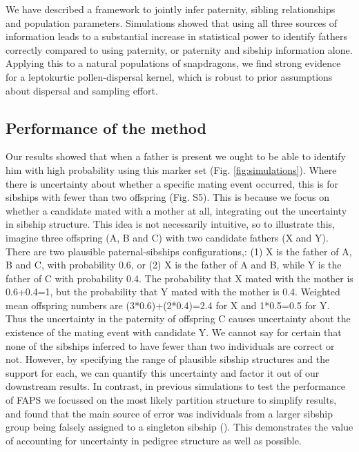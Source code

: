 \documentclass[10pt, a4paper, twocolumn]{article} %
\begin{document}
We have described a framework to jointly infer paternity, sibling relationships and population parameters. Simulations showed that using all three sources of information leads to a substantial increase in statistical power to identify fathers correctly compared to using paternity, or paternity and sibship information alone. Applying this to a natural populations of snapdragons, we find strong evidence for a leptokurtic pollen-dispersal kernel, which is robust to prior assumptions about dispersal and sampling effort.

\subsection{Performance of the method}

Our results showed that when a father is present we ought to be able to identify him with high probability using this marker set (Fig. \ref{fig:simulations}).
Where there is uncertainty about whether a specific mating event occurred, this is for sibships with fewer than two offspring (Fig. S5).
This is because we focus on whether a candidate mated with a mother at all, integrating out the uncertainty in sibship structure.
This idea is not necessarily intuitive, so to illustrate this, imagine three offspring (A, B and C) with two candidate fathers (X and Y).
There are two plausible paternal-sibships configurations,: (1) X is the father of A, B and C, with probability 0.6, or (2) X is the father of A and B, while Y is the father of C with probability 0.4.
The probability that X mated with the mother is 0.6+0.4=1, but the probability that Y mated with the mother is 0.4.
Weighted mean offspring numbers are (3*0.6)+(2*0.4)=2.4 for X and 1*0.5=0.5 for Y.
Thus the uncertainty in the paternity of offspring C causes uncertainty about the existence of the mating event with candidate Y.
We cannot say for certain that none of the sibships inferred to have fewer than two individuals are correct or not. 
However, by specifying the range of plausible sibship structures and the support for each, we can quantify this uncertainty and factor it out of our downstream results.
In contrast, in previous simulations to test the performance of FAPS we focussed on the most likely partition structure to simplify results, and found that the main source of error was individuals from a larger sibship group being falsely assigned to a singleton sibship (\cite{ellis2018efficient}).
This demonstrates the value of accounting for uncertainty in pedigree structure as well as possible.
\end{document}
